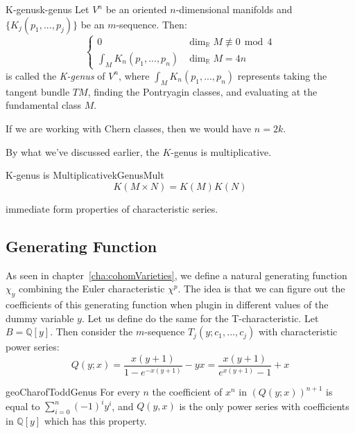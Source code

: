 \documentclass{book}
\newenvironment{Proof}[1][]
  {\begin{ProofTcb}[#1]}
  {\end{ProofTcb}}
\newcommand{\Q}{{\mathbb{Q}}}
\newcommand{\R}{{\mathbb{R}}}
\newcommand{\qn}{\quad\newline}
\renewcommand{\mod}{\,\operatorname{mod}\,}
\begin{document}
\begin{defn}{K-genus}{k-genus}
  Let $V^n$ be an oriented $n$-dimensional manifolds and $\{K_j(p_1, ..., p_j)\}$ be an $m$-sequence. Then:
  \[
    \begin{cases}
      0 & \dim_\R M \not\equiv 0 \mod 4\\
      \int_M K_n(p_1, ..., p_n) & \dim_\R M = 4n
    \end{cases}
  \]
  is called the \emph{K-genus} of $V^{n}$, where $\int_M K_n(p_1, ..., p_n)$ represents taking the tangent bundle
  $TM$, finding the Pontryagin classes, and evaluating at the fundamental class $M$.

  \qn
  If we are working with Chern classes, then we would have $n=2k$.
\end{defn}

By what we've discussed earlier, the $K$-genus is multiplicative.
\begin{prop}{K-genus is Multiplicative}{kGenusMult}
  \[
    K(M\times N) = K(M)K(N)
  \]
\end{prop}

\begin{Proof}
  immediate form properties of characteristic series.
\end{Proof}


\subsection{Generating Function}

As seen in chapter~\ref{cha:cohomVarieties}, we define a natural generating function $\chi_y$ combining the
Euler characteristic $\chi^p$. The idea is that we can figure out the coefficients of this generating
function when plugin in different values of the dummy variable $y$. Let us define do the same for the
T-characteristic. Let $B = \Q[y]$. Then consider the $m$-sequence $T_j(y; c_1, ..., c_j)$ with characteristic
power
series:
\[
  Q(y; x) = \frac{x(y+1)}{1-e^{-x(y+1)}} -yx = \frac{x(y+1)}{e^{x(y+1)}-1}+x
\]
\begin{lem}{}{geoCharofToddGenus}
  For every $n$ the coefficient of $x^n$ in $(Q(y;x))^{n+1}$ is equal to $\sum_{i=0}^n(-1)^iy^i$, and $Q(y,x)$
is the only power series with coefficients in $\mathbb{Q}[y]$ which has this property.
\end{lem}
\end{document}
